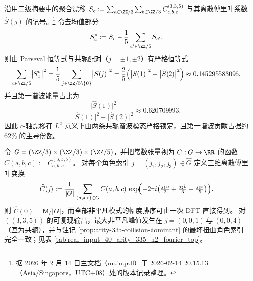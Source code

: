 \begin{remark}\label{rem:arity-335-collision-axis-bimodal-lock-parseval}
沿用二级摘要中的聚合漂移
\(
S_c:=\sum_{a\in\ZZ/3}\sum_{b\in\ZZ/3}C^{(3,3,5)}_{a,b,c}
\)
与其离散傅里叶系数 \(\widehat S(j)\) 的记号。\footnote{据 2026 年 2 月 14 日主文档（main.pdf）于 2026-02-14 20:15:13（Asia/Singapore，UTC+08）处的版本记录整理。}
令去均值部分
\[
S_c^\circ:=S_c-\frac{1}{5}\sum_{c'\in\ZZ/5}S_{c'}.
\]
则由 Parseval 恒等式与共轭配对（\(j=\pm1,\pm2\)）有严格恒等式
\[
\sum_{c\in\ZZ/5}\bigl|S_c^\circ\bigr|^2
=\frac{1}{5}\sum_{j\in\ZZ/5\setminus\{0\}}\bigl|\widehat S(j)\bigr|^2
=\frac{2}{5}\Bigl(\bigl|\widehat S(1)\bigr|^2+\bigl|\widehat S(2)\bigr|^2\Bigr)
\approx 0.145295583096,
\]
并且第一谐波能量占比为
\[
\frac{\bigl|\widehat S(1)\bigr|^2}{\bigl|\widehat S(1)\bigr|^2+\bigl|\widehat S(2)\bigr|^2}\approx 0.620709993.
\]
因此 \(c\)-轴漂移在 \(L^2\) 意义下由两条共轭谐波模态严格锁定，且第一谐波贡献占据约 \(62\%\) 的主导份额。
\end{remark}

\begin{remark}\label{rem:arity-335-constant-tensor-3d-dft-worst}
令 \(G=(\ZZ/3)\times(\ZZ/3)\times(\ZZ/5)\)，并把常数张量视为 \(C:G\to\RR\) 的函数 \(C(a,b,c):=C^{(3,3,5)}_{a,b,c}\)。
对每个角色索引 \(j=(j_1,j_2,j_3)\in\widehat G\) 定义三维离散傅里叶变换
\[
\widehat C(j)
:=\frac{1}{|G|}\sum_{(a,b,c)\in G} C(a,b,c)\,
\exp\!\Bigl(-2\pi i\bigl(\tfrac{j_1a}{3}+\tfrac{j_2b}{3}+\tfrac{j_3c}{5}\bigr)\Bigr).
\]
则 \(\widehat C(0)=\mathsf{M}/|G|\)，而全部非平凡模式的幅度排序可由一次 DFT 直接得到。
对 \(((3,3,5))\) 的可复现输出，最大非平凡峰值发生在
\(
j=(0,0,1)\ \text{与}\ (0,0,4)
\)
（互为共轭），并与注记 \ref{prop:arity-335-collision-dominant} 的最坏扭曲角色索引完全一致；见表 \ref{tab:real_input_40_arity_335_n2_fourier_top}。
\end{remark}


